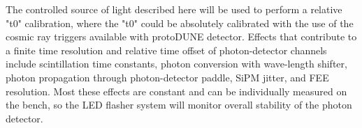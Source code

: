 The controlled source of light described here will be used to perform a relative "t0" calibration, where the "t0" could be absolutely calibrated with the use of the cosmic 
ray triggers available with protoDUNE detector. Effects that contribute to a finite time resolution and relative time offset of photon-detector channels include scintillation time constants, 
photon conversion with wave-length shifter, photon propagation through photon-detector paddle, SiPM jitter, and FEE resolution. Most these effects are constant and can be individually 
measured on the bench, so the LED flasher system will monitor overall stability of the photon detector.


%
